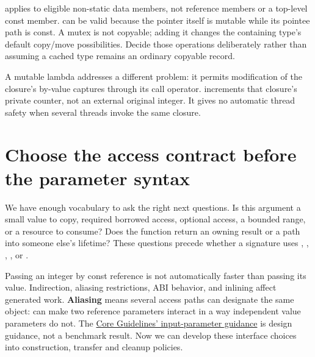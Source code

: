  applies to eligible non-static data members, not reference members or a top-level const member.  can be valid because the pointer itself is mutable while its pointee path is const. A mutex is not copyable; adding it changes the containing type's default copy/move possibilities. Decide those operations deliberately rather than assuming a cached type remains an ordinary copyable record.

A mutable lambda addresses a different problem: it permits modification of the closure's by-value captures through its call operator.  increments that closure's private counter, not an external original integer. It gives no automatic thread safety when several threads invoke the same closure.

\section{Choose the access contract before the parameter syntax}\label{05-engine-i-ch003-choose-the-access-contract-before-the-parameter-syntax}

\hypertarget{05-engine-i-ch003-choose-the-access-contract-before-the-parameter-syntax}{}

We have enough vocabulary to ask the right next questions. Is this argument a small value to copy, required borrowed access, optional access, a bounded range, or a resource to consume? Does the function return an owning result or a path into someone else's lifetime? These questions precede whether a signature uses , , , , or .

Passing an integer by const reference is not automatically faster than passing its value. Indirection, aliasing restrictions, ABI behavior, and inlining affect generated work. \textbf{Aliasing} means several access paths can designate the same object:  can make two reference parameters interact in a way independent value parameters do not. The \href{https://isocpp.github.io/CppCoreGuidelines/CppCoreGuidelines\#f16-for-in-parameters-pass-cheaply-copied-types-by-value-and-others-by-reference-to-const}{Core Guidelines' input-parameter guidance} is design guidance, not a benchmark result. Now we can develop these interface choices into construction, transfer and cleanup policies.

